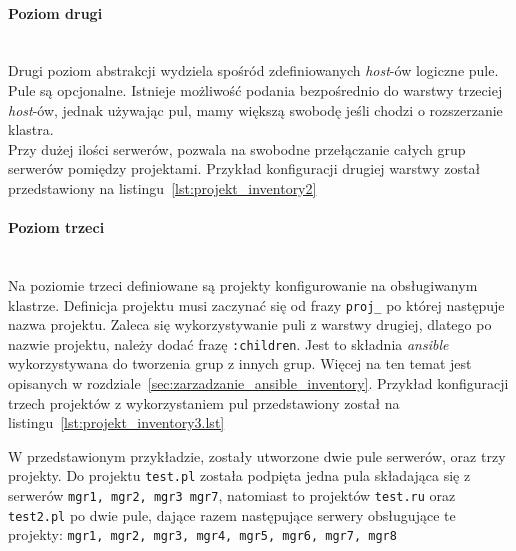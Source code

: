 \paragraph*{Poziom drugi}~\\
Drugi poziom abstrakcji wydziela spośród zdefiniowanych \textit{host}-ów logiczne pule.
Pule są opcjonalne.
Istnieje możliwość podania bezpośrednio do warstwy trzeciej \textit{host}-ów, jednak używając pul, mamy większą swobodę jeśli chodzi o rozszerzanie klastra.\\
Przy dużej ilości serwerów, pozwala na swobodne przełączanie całych grup serwerów pomiędzy projektami.
Przykład konfiguracji drugiej warstwy został przedstawiony na listingu~\ref{lst:projekt_inventory2}

\paragraph*{Poziom trzeci}~\\
Na poziomie trzeci definiowane są projekty konfigurowanie na obsługiwanym klastrze.
Definicja projektu musi zaczynać się od frazy \texttt{proj\_} po której następuje nazwa projektu.
Zaleca się wykorzystywanie puli z warstwy drugiej, dlatego po nazwie projektu, należy dodać frazę \texttt{:children}.
Jest to składnia \textit{ansible} wykorzystywana do tworzenia grup z innych grup.
Więcej na ten temat jest opisanych w rozdziale~\ref{sec:zarzadzanie_ansible_inventory}.
Przykład konfiguracji trzech projektów z wykorzystaniem pul przedstawiony został na listingu~\ref{lst:projekt_inventory3.lst}


W przedstawionym przykładzie, zostały utworzone dwie pule serwerów, oraz trzy projekty.
Do projektu \texttt{test.pl} została podpięta jedna pula składająca się z serwerów \texttt{mgr1, mgr2, mgr3 mgr7}, natomiast to projektów \texttt{test.ru} oraz \texttt{test2.pl} po dwie pule, dające razem następujące serwery obsługujące te projekty: \texttt{mgr1, mgr2, mgr3, mgr4, mgr5, mgr6, mgr7, mgr8}
